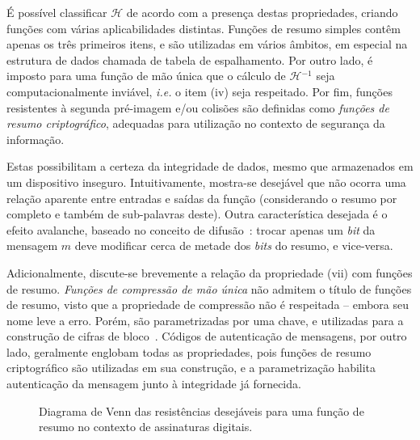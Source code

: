 \documentclass[12pt,notitlepage]{report}
\newcommand{\hh}{\mathcal{H}}
\def\precircle{(0.00, 0) circle (1.25cm)}
\def\seccircle{(1.75, 0) circle (1.25cm)}
\def\colcircle{(1.75, 0) circle (0.75cm)}
\begin{document}
É possível classificar $\hh{}$ de acordo com a presença destas propriedades,
criando funções com várias aplicabilidades distintas. Funções de
resumo simples contêm apenas os três primeiros itens, e são utilizadas em
vários âmbitos, em especial na estrutura de dados chamada de tabela de
espalhamento. Por outro lado, é imposto para uma função de mão única que
o cálculo de $\hh{}^{-1}$ seja computacionalmente inviável, \emph{i.e.} o item (iv)
seja respeitado. Por fim, funções resistentes à segunda pré-imagem e/ou colisões
são definidas como \emph{funções de resumo criptográfico}, adequadas para
utilização no contexto de segurança da informação.

Estas possibilitam a certeza da integridade de dados, mesmo que armazenados em
um dispositivo inseguro. Intuitivamente, mostra-se desejável que não ocorra
uma relação aparente entre entradas e saídas da função (considerando o resumo
por completo e também de sub-palavras deste). Outra característica desejada
é o efeito avalanche, baseado no conceito de
difusão~\cite{Stallings:2010:CNS:1824151}: trocar apenas um \emph{bit} da
mensagem $m$ deve modificar cerca de metade dos \emph{bits} do resumo, e
vice-versa.

Adicionalmente, discute-se brevemente a relação da propriedade (vii) com funções
de resumo. \emph{Funções de compressão de mão única} não admitem o título de funções
de resumo, visto que a propriedade de compressão não é respeitada -- embora seu
nome leve a erro. Porém, são parametrizadas por uma chave, e utilizadas para a
construção de cifras de bloco~\cite[9.25]{Menezes:1996:HAC:548089}. Códigos de
autenticação de mensagens, por outro lado, geralmente englobam todas as
propriedades, pois funções de resumo criptográfico são utilizadas em sua construção,
e a parametrização habilita autenticação da mensagem junto à integridade já
fornecida.

\begin{figure}[h]
  \centering
  \caption{Diagrama de Venn das resistências desejáveis para uma função de
    resumo no contexto de assinaturas digitais.}
  \label{fig:1}
\end{figure}
\end{document}
